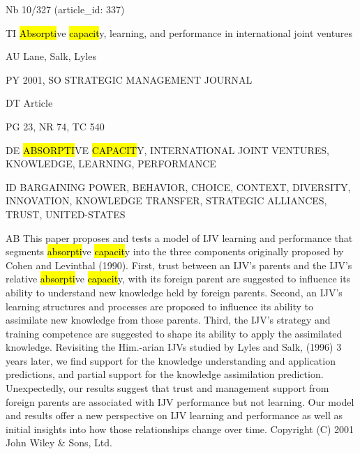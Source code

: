 \documentclass[a4paper]{article}
\begin{document}
\vspace*{-2cm}
Nb \tabto{0cm}10/327 (article\_id: 337)\par
TI \tabto{0cm}\hl{Absorpti}ve \hl{capacit}y, learning, and performance in international joint ventures\par
AU \tabto{0cm}Lane, Salk, Lyles\par
PY \tabto{0cm}2001, SO STRATEGIC MANAGEMENT JOURNAL\par
DT \tabto{0cm}Article\par
PG \tabto{0cm}23, NR 74, TC 540\par
DE \tabto{0cm}\hl{ABSORPTI}VE \hl{CAPACIT}Y, INTERNATIONAL JOINT VENTURES, KNOWLEDGE, LEARNING, PERFORMANCE\par
ID \tabto{0cm}BARGAINING POWER, BEHAVIOR, CHOICE, CONTEXT, DIVERSITY, INNOVATION, KNOWLEDGE TRANSFER, STRATEGIC ALLIANCES, TRUST, UNITED-STATES\par
AB \tabto{0cm}This paper proposes and tests a model of IJV learning and performance that segments \hl{absorpti}ve \hl{capacit}y into the three components originally proposed by Cohen and Levinthal (1990). First, trust between an IJV's parents and the IJV's relative \hl{absorpti}ve \hl{capacit}y, with its foreign parent are suggested to influence its ability to understand new knowledge held by foreign parents. Second, an IJV's learning structures and processes are proposed to influence its ability to assimilate new knowledge from those parents. Third, the IJV's strategy and training competence are suggested to shape its ability to apply the assimilated knowledge. Revisiting the Him.-arian IJVs studied by Lyles and Salk, (1996) 3 years later, we find support for the knowledge understanding and application predictions, and partial support for the knowledge assimilation prediction. Unexpectedly, our results suggest that trust and management support from foreign parents are associated with IJV performance but not learning. Our model and results offer a new perspective on IJV learning and performance as well as initial insights into how those relationships change over time. Copyright (C) 2001 John Wiley \& Sons, Ltd.\par
\clearpage
\end{document}
